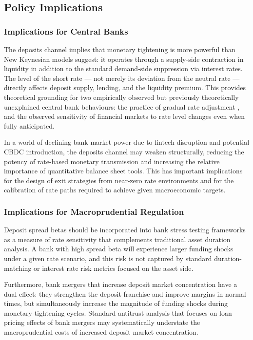 \documentclass[12pt,a4paper]{article}
\begin{document}
\subsection{Policy Implications}

\subsubsection{Implications for Central Banks}

The deposits channel implies that monetary tightening is more powerful than
New Keynesian models suggest: it operates through a supply-side contraction in
liquidity in addition to the standard demand-side suppression via interest
rates. The level of the short rate --- not merely its deviation from the neutral
rate --- directly affects deposit supply, lending, and the liquidity premium.
This provides theoretical grounding for two empirically observed but previously
theoretically unexplained central bank behaviours: the practice of gradual rate
adjustment \citep{bernanke_2004, stein_sunderam_2015}, and the observed
sensitivity of financial markets to rate level changes even when fully
anticipated.

In a world of declining bank market power due to fintech disruption and
potential CBDC introduction, the deposits channel may weaken structurally,
reducing the potency of rate-based monetary transmission and increasing the
relative importance of quantitative balance sheet tools. This has important
implications for the design of exit strategies from near-zero rate environments
and for the calibration of rate paths required to achieve given macroeconomic
targets.

\subsubsection{Implications for Macroprudential Regulation}

Deposit spread betas should be incorporated into bank stress testing frameworks
as a measure of rate sensitivity that complements traditional asset duration
analysis. A bank with high spread beta will experience larger funding shocks
under a given rate scenario, and this risk is not captured by standard
duration-matching or interest rate risk metrics focused on the asset side.

Furthermore, bank mergers that increase deposit market concentration have a
dual effect: they strengthen the deposit franchise and improve margins in
normal times, but simultaneously increase the magnitude of funding shocks
during monetary tightening cycles. Standard antitrust analysis that focuses
on loan pricing effects of bank mergers may systematically understate the
macroprudential costs of increased deposit market concentration.
\end{document}
